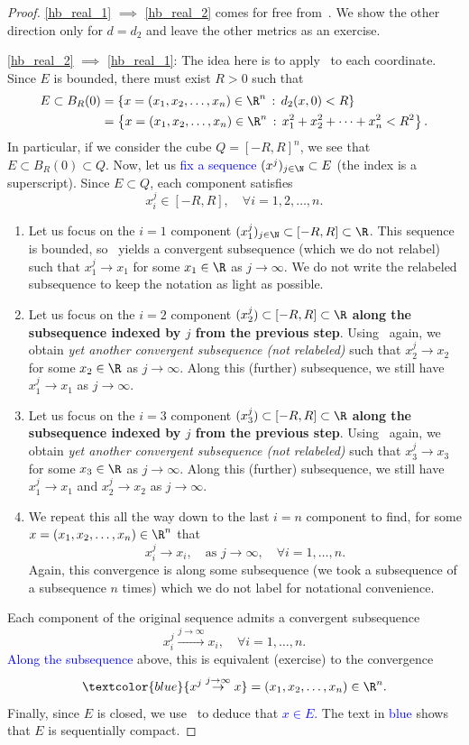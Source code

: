 \begin{proof}
\ref{hb_real_1} $\implies$ \ref{hb_real_2} comes for free from~. We show the other direction only for $d=d_2$ and leave the other metrics as an exercise.

\ref{hb_real_2} $\implies$ \ref{hb_real_1}: The idea here is to apply~ to each coordinate. Since $E$ is bounded, there must exist $R>0$ such that
\begin{align*}
E \subset B_R(0) &= \left\{
x=(x_1,x_2,\dots, x_n)\in \R^n \, : \, d_2(x,0)<R
\right\} 	\\
&= \left\{
x=(x_1,x_2,\dots, x_n)\in \R^n \, : \, x_1^2 + x_2^2 + \dots+ x_n^2 < R^2
\right\}.
\end{align*}
In particular, if we consider the cube $Q = [-R,R]^n$, we see that $E\subset B_R(0) \subset Q$. Now, let us \textcolor{blue}{fix a sequence $(x^j)_{j\in \N}\subset E$} (the index is a superscript). Since $E\subset Q$, each component satisfies
\[
x_i^j \in [-R,R],\quad \forall i=1,2,\dots, n.
\]
\begin{enumerate}
	\item Let us focus on the $i=1$ component $(x_1^j)_{j\in\N}\subset [-R,R]\subset \R$. This sequence is bounded, so~ yields a convergent subsequence (which we do not relabel) such that $x_1^j \to x_1$ for some $x_1\in \R$ as $j\to \infty$. We do not write the relabeled subsequence to keep the notation as light as possible.
	\item Let us focus on the $i=2$ component $(x_2^j)\subset [-R,R]\subset \R$ \textbf{along the subsequence indexed by $j$ from the previous step}. Using~ again, we obtain \textit{yet another convergent subsequence (not relabeled)} such that $x_2^j \to x_2$ for some $x_2 \in \R$ as $j\to \infty$. Along this (further) subsequence, we still have $x_1^j \to x_1$ as $j\to \infty$.
	\item Let us focus on the $i=3$ component $(x_3^j)\subset [-R,R]\subset \R$ \textbf{along the subsequence indexed by $j$ from the previous step}. Using~ again, we obtain \textit{yet another convergent subsequence (not relabeled)} such that $x_3^j \to x_3$ for some $x_3 \in \R$ as $j\to \infty$. Along this (further) subsequence, we still have $x_1^j\to x_1$ and $x_2^j \to x_2$ as $j\to \infty$.
	\item We repeat this all the way down to the last $i=n$ component to find, for some $x = (x_1,x_2,\dots, x_n)\in \R^n$ that
	\[
	x_i^j \to x_i,\quad\text{as }j\to \infty,\quad \forall i=1,\dots, n.
	\]
	Again, this convergence is along some subsequence (we took a subsequence of a subsequence $n$ times) which we do not label for notational convenience.
\end{enumerate}
Each component of the original sequence admits a convergent subsequence
\[
x_i^j\overset{j\to \infty}{\to} x_i,\quad \forall i=1,\dots, n.
\]
\textcolor{blue}{Along the subsequence} above, this is equivalent (exercise) to the convergence
\[
\textcolor{blue}{x^j \overset{j\to \infty}{\to} x} = (x_1,x_2,\dots, x_n)\in \R^n.
\]
Finally, since $E$ is closed, we use~ to deduce that \textcolor{blue}{$x\in E$.} The text in \textcolor{blue}{blue} shows that $E$ is sequentially compact.
\end{proof}
